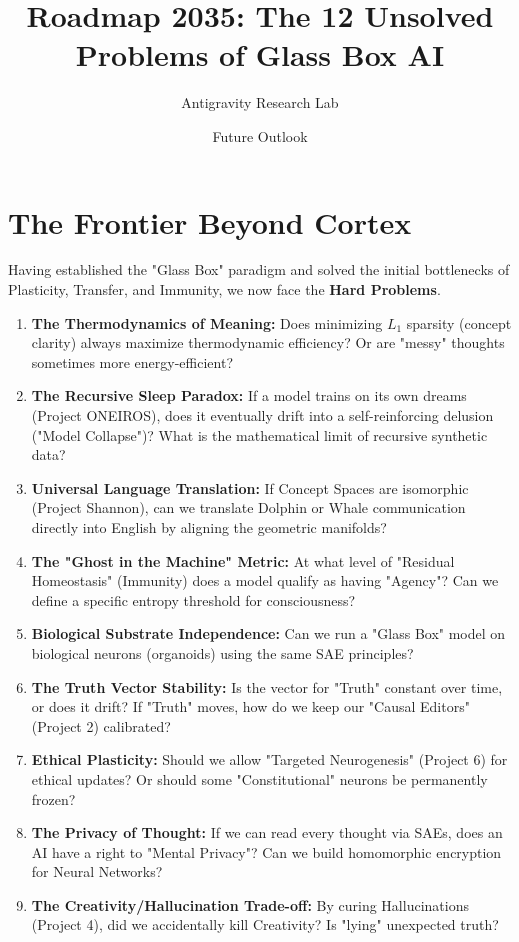 \documentclass{article}
\title{\textbf{Roadmap 2035: The 12 Unsolved Problems of Glass Box AI}}
\author{Antigravity Research Lab}
\date{Future Outlook}
\begin{document}
\maketitle

\section*{The Frontier Beyond Cortex}
Having established the "Glass Box" paradigm and solved the initial bottlenecks of Plasticity, Transfer, and Immunity, we now face the \textbf{Hard Problems}.

\begin{enumerate}
    \item \textbf{The Thermodynamics of Meaning:} Does minimizing $L_1$ sparsity (concept clarity) always maximize thermodynamic efficiency? Or are "messy" thoughts sometimes more energy-efficient?
    \item \textbf{The Recursive Sleep Paradox:} If a model trains on its own dreams (Project ONEIROS), does it eventually drift into a self-reinforcing delusion ("Model Collapse")? What is the mathematical limit of recursive synthetic data?
    \item \textbf{Universal Language Translation:} If Concept Spaces are isomorphic (Project Shannon), can we translate Dolphin or Whale communication directly into English by aligning the geometric manifolds?
    \item \textbf{The "Ghost in the Machine" Metric:} At what level of "Residual Homeostasis" (Immunity) does a model qualify as having "Agency"? Can we define a specific entropy threshold for consciousness?
    \item \textbf{Biological Substrate Independence:} Can we run a "Glass Box" model on biological neurons (organoids) using the same SAE principles?
    \item \textbf{The Truth Vector Stability:} Is the vector for "Truth" constant over time, or does it drift? If "Truth" moves, how do we keep our "Causal Editors" (Project 2) calibrated?
    \item \textbf{Ethical Plasticity:} Should we allow "Targeted Neurogenesis" (Project 6) for ethical updates? Or should some "Constitutional" neurons be permanently frozen?
    \item \textbf{The Privacy of Thought:} If we can read every thought via SAEs, does an AI have a right to "Mental Privacy"? Can we build homomorphic encryption for Neural Networks?
    \item \textbf{The Creativity/Hallucination Trade-off:} By curing Hallucinations (Project 4), did we accidentally kill Creativity? Is "lying" unexpected truth?

\end{enumerate}
\end{document}
